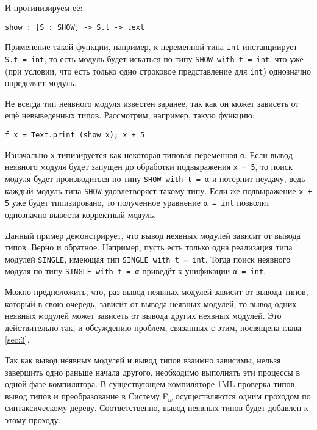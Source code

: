 \documentclass[../diploma.tex]{subfiles}
\begin{document}
И протипизируем её:

\begin{verbatim}
show : [S : SHOW] -> S.t -> text
\end{verbatim}

Применение такой функции, например, к переменной типа \texttt{int} инстанциирует \\\texttt{S.t = int}, то есть модуль будет искаться по типу \texttt{SHOW with t = int}, что уже (при условии, что есть только одно строковое представление для \texttt{int}) однозначно определяет модуль.

Не всегда тип неявного модуля известен заранее, так как он может зависеть от ещё невыведенных типов. Рассмотрим, например, такую функцию:

\begin{verbatim}
f x = Text.print (show x); x + 5
\end{verbatim}

Изначально \texttt{x} типизируется как некоторая типовая переменная \texttt{α}. Если вывод неявного модуля будет запущен до обработки подвыражения \texttt{x + 5}, то поиск модуля будет производиться по типу \texttt{SHOW with t = α} и потерпит неудачу, ведь каждый модуль типа \texttt{SHOW} удовлетворяет такому типу. Если же подвыражение \texttt{x + 5} уже будет типизировано, то полученное уравнение \texttt{α = int} позволит однозначно вывести корректный модуль.

Данный пример демонстрирует, что вывод неявных модулей зависит от вывода типов. Верно и обратное. Например, пусть есть только одна реализация типа модулей \texttt{SINGLE}, имеющая тип \texttt{SINGLE with t = int}. Тогда поиск неявного модуля по типу \texttt{SINGLE with t = α} приведёт к унификации \texttt{α = int}.

Можно предположить, что, раз вывод неявных модулей зависит от вывода типов, который в свою очередь, зависит от вывода неявных модулей, то вывод одних неявных модулей может зависеть от вывода других неявных модулей. Это действительно так, и обсуждению проблем, связанных с этим, посвящена глава \ref{sec:3}.

Так как вывод неявных модулей и вывод типов взаимно зависимы, нельзя завершить одно раньше начала другого, необходимо выполнять эти процессы в одной фазе компилятора. В существующем компиляторе 1ML проверка типов, вывод типов и преобразование в Систему F\textsubscript{$\omega$} осуществляются одним проходом по синтаксическому дереву. Соответственно, вывод неявных типов будет добавлен к этому проходу.
\end{document}
